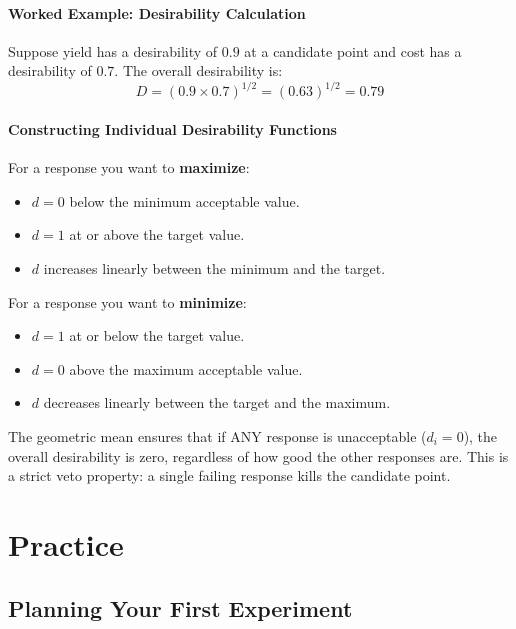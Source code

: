 \documentclass[11pt]{book}
\begin{document}
\subsection{Worked Example: Desirability Calculation}

Suppose yield has a desirability of $0.9$ at a candidate point and cost has a
desirability of $0.7$. The overall desirability is:
\[
D = (0.9 \times 0.7)^{1/2} = (0.63)^{1/2} = 0.79
\]

\subsection{Constructing Individual Desirability Functions}

For a response you want to \textbf{maximize}:
\begin{itemize}[nosep]
\item $d = 0$ below the minimum acceptable value.
\item $d = 1$ at or above the target value.
\item $d$ increases linearly between the minimum and the target.
\end{itemize}

For a response you want to \textbf{minimize}:
\begin{itemize}[nosep]
\item $d = 1$ at or below the target value.
\item $d = 0$ above the maximum acceptable value.
\item $d$ decreases linearly between the target and the maximum.
\end{itemize}

The geometric mean ensures that if ANY response is unacceptable ($d_i = 0$),
the overall desirability is zero, regardless of how good the other responses
are. This is a strict veto property: a single failing response kills the
candidate point.


\part{Practice}

\chapter{Planning Your First Experiment}
\end{document}
